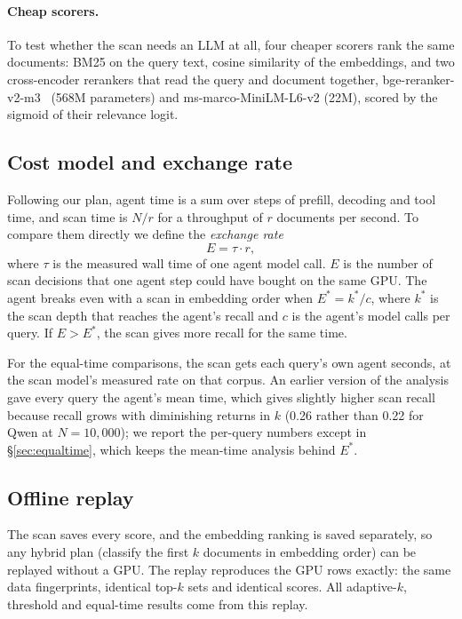 \documentclass[11pt]{article}
\begin{document}
\paragraph{Cheap scorers.}
To test whether the scan needs an LLM at all, four cheaper scorers rank the
same documents: BM25 on the query text, cosine similarity of the embeddings, and
two cross-encoder rerankers that read the query and document together,
bge-reranker-v2-m3~\cite{chen2024bgem3} (568M parameters) and
ms-marco-MiniLM-L6-v2 (22M), scored by the sigmoid of their relevance logit.

\subsection{Cost model and exchange rate}

Following our plan, agent time is a sum over steps of prefill, decoding and
tool time, and scan time is $N / r$ for a throughput of $r$ documents per
second. To compare them directly we define the \emph{exchange rate}
\begin{equation}
E = \tau \cdot r,
\end{equation}
where $\tau$ is the measured wall time of one agent model call. $E$ is the
number of scan decisions that one agent step could have bought on the same
GPU. The agent breaks even with a scan in embedding order when
$E^\ast = k^\ast / c$, where $k^\ast$ is the scan depth that reaches the
agent's recall and $c$ is the agent's model calls per query. If $E > E^\ast$,
the scan gives more recall for the same time.

For the equal-time comparisons, the scan gets each query's own agent seconds,
at the scan model's measured rate on that corpus. An earlier version of the
analysis gave every query the agent's mean time, which gives slightly higher
scan recall because recall grows with diminishing returns in $k$ (0.26 rather
than 0.22 for Qwen at $N=10{,}000$); we report the per-query numbers except in
\S\ref{sec:equaltime}, which keeps the mean-time analysis behind $E^\ast$.

\subsection{Offline replay}

The scan saves every score, and the embedding ranking is saved separately, so
any hybrid plan (classify the first $k$ documents in embedding order) can be
replayed without a GPU. The replay reproduces the GPU rows exactly: the same
data fingerprints, identical top-$k$ sets and identical scores. All adaptive-$k$,
threshold and equal-time results come from this replay.
\end{document}
